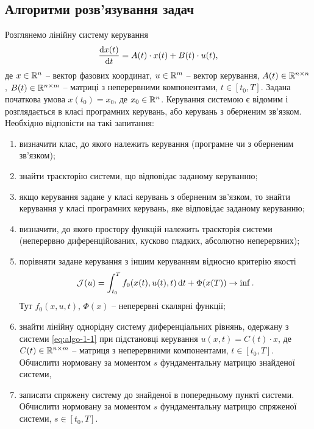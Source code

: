 \subsection{Алгоритми розв'язування задач}

\begin{problem*}
	Розглянемо лінійну систему керування 
	\begin{equation} 
	    \label{eq:algo-1-1}
	    \frac{\mathop{}\!\mathrm{d} x(t)}{\mathop{}\!\mathrm{d} t} = A (t) \cdot x(t) + B(t) \cdot u(t),
	\end{equation} 
	де $x \in \mathbb{R}^n$ -- вектор фазових координат, $u \in \mathbb{R}^m$ -- вектор керування, $A(t) \in \mathbb{R}^{n\times n}$, $B(t) \in \mathbb{R}^{n \times m}$ -- матриці з неперервними компонентами, $t \in [t_0, T]$. Задана початкова умова $x(t_0) = x_0$, де $x_0 \in \mathbb{R}^n$.  Керування системою є відомим і розглядається в класі програмних керувань, або керувань з оберненим зв'язком. Необхідно відповісти на такі запитання:
	\begin{enumerate}
		\item визначити клас, до якого належить керування (програмне чи з оберненим зв'язком);
		\item знайти траєкторію системи, що відповідає заданому керуванню;
		\item якщо керування задане у класі керувань з оберненим зв'язком, то знайти керування у класі програмних керувань, яке відповідає заданому керуванню;
		\item визначити, до якого простору функцій належить траєкторія системи (неперервно диференційованих, кусково гладких, абсолютно неперервних);
		\item порівняти задане керування з іншим керуванням відносно критерію якості 
		\begin{equation}
		    \label{eq:algo-1-2}
		    \mathcal{J}(u) = \int_{t_0}^T f_0(x(t), u(t), t) \mathop{}\!\mathrm{d} t + \Phi(x(T)) \to \inf.   
		\end{equation}
	Тут $f_0(x,u,t)$, $\Phi (x)$ -- неперервні скалярні функції;
	   \item знайти лінійну однорідну систему диференціальних рівнянь, одержану з системи \eqref{eq:algo-1-1} при підстановці керування $u(x,t) = C(t) \cdot x$, де $C(t) \in \mathbb{R}^{n\times m}$ -- матриця з неперервними компонентами, $t \in [t_0, T]$. Обчислити нормовану за моментом $s$ фундаментальну матрицю знайденої системи, 
	   \item записати спряжену систему до знайденої в попередньому пункті системи. Обчислити  нормовану за моментом $s$ фундаментальну матрицю спряженої системи,  $s \in [t_0, T]$.
	
	\end{enumerate}
\end{problem*}

